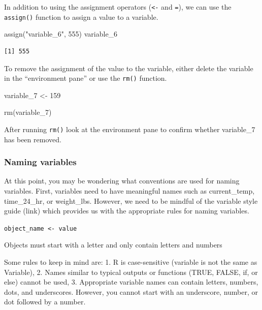 \documentclass[
  letterpaper,
  DIV=11,
  numbers=noendperiod]{scrreprt}
\newenvironment{Shaded}{\begin{snugshade}}{\end{snugshade}}
\newcommand{\DecValTok}[1]{\textcolor[rgb]{0.68,0.00,0.00}{#1}}
\newcommand{\FunctionTok}[1]{\textcolor[rgb]{0.28,0.35,0.67}{#1}}
\newcommand{\NormalTok}[1]{\textcolor[rgb]{0.00,0.23,0.31}{#1}}
\newcommand{\OtherTok}[1]{\textcolor[rgb]{0.00,0.23,0.31}{#1}}
\newcommand{\StringTok}[1]{\textcolor[rgb]{0.13,0.47,0.30}{#1}}
\begin{document}
In addition to using the assignment operators (\texttt{\textless{}-} and
\texttt{=}), we can use the \texttt{assign()} function to assign a value
to a variable.

\begin{Shaded}
\begin{Highlighting}[]
\FunctionTok{assign}\NormalTok{(}\StringTok{"variable\_6"}\NormalTok{, }\DecValTok{555}\NormalTok{)}
\NormalTok{variable\_6}
\end{Highlighting}
\end{Shaded}

\begin{verbatim}
[1] 555
\end{verbatim}

To remove the assignment of the value to the variable, either delete the
variable in the ``environment pane'' or use the \texttt{rm()} function.

\begin{Shaded}
\begin{Highlighting}[]
\NormalTok{variable\_7 }\OtherTok{\textless{}{-}} \DecValTok{159}
\end{Highlighting}
\end{Shaded}

\begin{Shaded}
\begin{Highlighting}[]
\FunctionTok{rm}\NormalTok{(variable\_7)}
\end{Highlighting}
\end{Shaded}

After running \texttt{rm()} look at the environment pane to confirm
whether variable\_7 has been removed.

\subsubsection{Naming variables}\label{naming-variables}

At this point, you may be wondering what conventions are used for naming
variables. First, variables need to have meaningful names such as
current\_temp, time\_24\_hr, or weight\_lbs. However, we need to be
mindful of the variable style guide (link) which provides us with the
appropriate rules for naming variables.

\texttt{object\_name\ \textless{}-\ value}

Objects must start with a letter and only contain letters and numbers

Some rules to keep in mind are: 1. R is case-sensitive (variable is not
the same as Variable), 2. Names similar to typical outputs or functions
(TRUE, FALSE, if, or else) cannot be used, 3. Appropriate variable names
can contain letters, numbers, dots, and underscores. However, you cannot
start with an underscore, number, or dot followed by a number.
\end{document}
